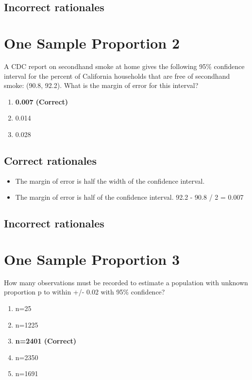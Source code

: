 \documentclass[letterpaper,9pt,twoside,printwatermark=false]{pinp}
\providecommand{\tightlist}{%
  \setlength{\itemsep}{0pt}\setlength{\parskip}{0pt}}
\begin{document}
\subsection{Incorrect rationales}\label{incorrect-rationales-6}

\section{One Sample Proportion 2}\label{one-sample-proportion-2}

A CDC report on secondhand smoke at home gives the following 95\%
confidence interval for the percent of California households that are
free of secondhand smoke: (90.8, 92.2). What is the margin of error for
this interval?

\begin{enumerate}
\def\labelenumi{\alph{enumi}.}
\tightlist
\item
  \textbf{0.007 (Correct)}
\item
  0.014
\item
  0.028
\end{enumerate}

\subsection{Correct rationales}\label{correct-rationales-7}

\begin{itemize}
\tightlist
\item
  The margin of error is half the width of the confidence interval.
\item
  The margin of error is half of the confidence interval. 92.2 - 90.8 /
  2 = 0.007
\end{itemize}

\subsection{Incorrect rationales}\label{incorrect-rationales-7}

\section{One Sample Proportion 3}\label{one-sample-proportion-3}

How many observations must be recorded to estimate a population with
unknown proportion p to within +/- 0.02 with 95\% confidence?

\begin{enumerate}
\def\labelenumi{\alph{enumi}.}
\tightlist
\item
  n=25
\item
  n=1225
\item
  \textbf{n=2401 (Correct)}
\item
  n=2350
\item
  n=1691
\end{enumerate}
\end{document}
